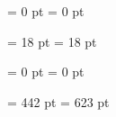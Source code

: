 \pagestyle{headings}

\voffset = 0 pt
\hoffset = 0 pt

\oddsidemargin = 18 pt
\topmargin = 18 pt

\marginparsep = 0 pt
\marginparwidth = 0 pt

\textwidth = 442 pt
\textheight = 623 pt


